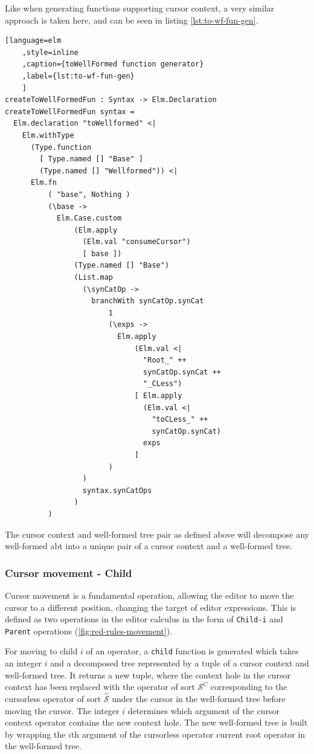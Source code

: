 Like when generating functions supporting cursor context, a very similar approach
is taken here, and can be seen in listing \cref{lst:to-wf-fun-gen}.

\begin{minipage}{\textwidth}
  \begin{lstlisting}[language=elm
    ,style=inline
    ,caption={toWellFormed function generator}
    ,label={lst:to-wf-fun-gen}
    ]
createToWellFormedFun : Syntax -> Elm.Declaration
createToWellFormedFun syntax =
  Elm.declaration "toWellformed" <|
    Elm.withType 
      (Type.function 
        [ Type.named [] "Base" ] 
        (Type.named [] "Wellformed")) <|
      Elm.fn
          ( "base", Nothing )
          (\base ->
            Elm.Case.custom
                (Elm.apply 
                  (Elm.val "consumeCursor") 
                  [ base ])
                (Type.named [] "Base")
                (List.map
                  (\synCatOp ->
                    branchWith synCatOp.synCat
                        1
                        (\exps ->
                          Elm.apply
                              (Elm.val <| 
                                "Root_" ++ 
                                synCatOp.synCat ++ 
                                "_CLess")
                              [ Elm.apply 
                                (Elm.val <| 
                                  "toCLess_" ++ 
                                  synCatOp.synCat) 
                                exps 
                              ]
                        )
                  )
                  syntax.synCatOps
                )
          )
\end{lstlisting}
\end{minipage}

The cursor context and well-formed tree pair as defined above will decompose
any well-formed abt into a unique pair of a cursor context and a well-formed tree.


\subsubsection{Cursor movement - Child}
Cursor movement is a fundamental operation, allowing the editor to move the cursor
to a different position, changing the target of editor expressions. This is defined
as two operations in the editor calculus in the form of
\texttt{Child-i} and \texttt{Parent} operations (\cref{fig:red-rules-movement}).

For moving to child $i$ of an operator, a \texttt{child} function is generated
which takes an integer $i$ and a decomposed tree represented by a tuple of a cursor
context and well-formed tree. It returns a new tuple, where the context hole in
the cursor context has been replaced with the operator of sort $\mathcal{S}^C$ corresponding to the cursorless
operator of sort $\hat{\mathcal{S}}$ under the cursor in the well-formed tree before
moving the cursor. The integer $i$ determines which argument of the cursor context
operator contains the new context hole. The new well-formed tree is built by
wrapping the $i$th argument of the cursorless operator current root operator
in the well-formed tree.

